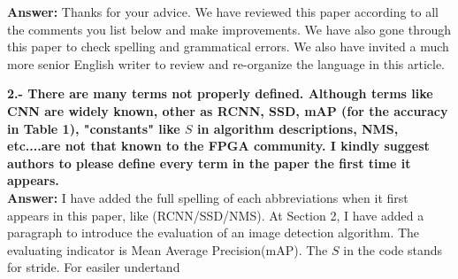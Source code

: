 \documentclass[12pt]{paper}
\newcommand{\answer}[1]{\noindent\textbf{Answer:} #1}
\newcommand{\comment}[1]{\noindent\textbf{#1}\\}
\begin{document}
\answer{Thanks for your advice. We have reviewed this paper according to all the comments you list below and make improvements. We have also gone through this paper to check spelling and grammatical errors. We also have invited a much more senior English writer to review and re-organize the language in this article.}

\comment{2.- There are many terms not properly defined. Although terms like CNN are widely known, other as RCNN, SSD, mAP (for the accuracy in Table 1), "constants" like $S$ in algorithm descriptions, NMS, etc....are not that known to the FPGA community. I kindly suggest authors to please define every term in the paper the first time it appears.}

\answer{I have added the full spelling of each abbreviations when it first appears in this paper, like (RCNN/SSD/NMS). At Section 2, I have added a paragraph to introduce the evaluation of an image detection algorithm. The evaluating indicator is Mean Average Precision(mAP). The $S$ in the code stands for stride. For easiler undertand 
}
\end{document}

